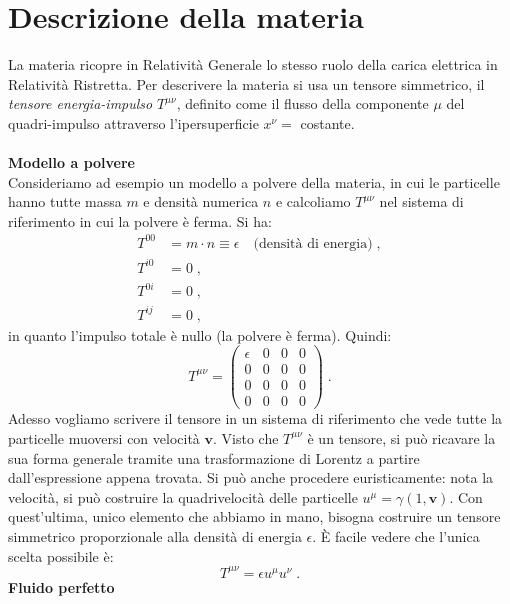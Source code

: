 \documentclass[12pt,a4paper]{report}
\theoremstyle{definition}
\begin{document}
\chapter*{Descrizione della materia}
La materia ricopre in Relatività Generale lo stesso ruolo della carica elettrica in Relatività Ristretta. Per descrivere la materia si usa un tensore simmetrico, il \emph{tensore energia-impulso} $T^{\mu\nu}$, definito come il flusso della componente $\mu$ del quadri-impulso attraverso l'ipersuperficie $x^{\nu}=$ costante. \\
\\
\textbf{Modello a polvere} \\
Consideriamo ad esempio un modello a polvere della materia, in cui le particelle hanno tutte massa $m$ e densità numerica $n$ e calcoliamo $T^{\mu\nu}$ nel sistema di riferimento in cui la polvere è ferma. Si ha:
\begin{align*}
T^{00} &= m\cdot n \equiv \epsilon\quad \mbox{(densità di energia)}\;, \\
T^{i0} &= 0\;, \\
T^{0i} &= 0\;, \\
T^{ij} &= 0\;,
\end{align*}
in quanto l'impulso totale è nullo (la polvere è ferma). Quindi:
\begin{equation}
T^{\mu\nu}=\left(\begin{matrix}
\epsilon & 0 & 0 & 0 \\
0 & 0 & 0 & 0 \\
0 & 0 & 0 & 0 \\
0 & 0 & 0 & 0
\end{matrix}\right)\;.
\end{equation}
Adesso vogliamo scrivere il tensore in un sistema di riferimento che vede tutte la particelle muoversi con velocità $\mathbf{v}$. Visto che $T^{\mu\nu}$ è un tensore, si può ricavare la sua forma generale tramite una trasformazione di Lorentz a partire dall'espressione appena trovata. Si può anche procedere euristicamente: nota la velocità, si può costruire la quadrivelocità delle particelle $u^{\mu}=\gamma(1,\mathbf{v})$. Con quest'ultima, unico elemento che abbiamo in mano, bisogna costruire un tensore simmetrico proporzionale alla densità di energia $\epsilon$. È facile vedere che l'unica scelta possibile è:
\begin{equation}
T^{\mu\nu}=\epsilon u^{\mu}u^{\nu}\;.
\end{equation}
\textbf{Fluido perfetto} \\
\end{document}
